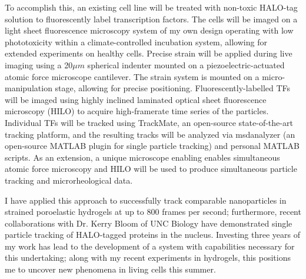 \begin{indented}
To accomplish this, an existing cell line will be treated with non-toxic HALO-tag solution to fluorescently label transcription factors. The cells will be imaged on a light sheet fluorescence microscopy system of my own design operating with low phototoxicity within a climate-controlled incubation system, allowing for extended experiments on healthy cells. Precise strain will be applied during live imaging using a 20$\mu m$ spherical indenter mounted on a piezoelectric-actuated atomic force microscope cantilever. The strain system is mounted on a micro-manipulation stage, allowing for precise positioning.
Fluorescently-labelled TFs will be imaged using highly inclined laminated optical sheet fluorescence microscopy (HILO) to acquire high-framerate time series of the particles. Individual TFs will be tracked using TrackMate, an open-source state-of-the-art tracking platform, and the resulting tracks will be analyzed via msdanalyzer (an open-source MATLAB plugin for single particle tracking) and personal MATLAB scripts. As an extension, a unique microscope enabling enables simultaneous atomic force microscopy and HILO will be used to produce simultaneous particle tracking and microrheological data.\par 
I have applied this approach to successfully track comparable nanoparticles in strained poroelastic hydrogels at up to 800 frames per second; furthermore, recent collaborations with Dr. Kerry Bloom of UNC Biology have demonstrated single particle tracking of HALO-tagged proteins in the nucleus. Investing three years of my work has lead to the development of a system with capabilities necessary for this undertaking; along with my recent experiments in hydrogels, this positions me to uncover new phenomena in living cells this summer.
\end{indented}
\newpage
% 
\newpage
% 
\newpage
